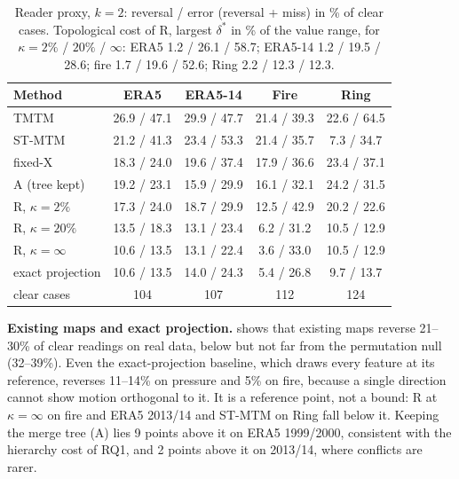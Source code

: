 \documentclass[review]{vgtc}                 %
\begin{document}
\begin{table}[t]
\centering\small
\setlength{\tabcolsep}{2.6pt}
\begin{tabular}{lcccc}\toprule
Method & ERA5 & ERA5-14 & Fire & Ring\\\midrule
TMTM & 26.9 / 47.1 & 29.9 / 47.7 & 21.4 / 39.3 & 22.6 / 64.5\\
ST-MTM & 21.2 / 41.3 & 23.4 / 53.3 & 21.4 / 35.7 & \phantom{0}7.3 / 34.7\\
fixed-X & 18.3 / 24.0 & 19.6 / 37.4 & 17.9 / 36.6 & 23.4 / 37.1\\
A (tree kept) & 19.2 / 23.1 & 15.9 / 29.9 & 16.1 / 32.1 & 24.2 / 31.5\\\midrule
R, $\kappa=2\%$ & 17.3 / 24.0 & 18.7 / 29.9 & 12.5 / 42.9 & 20.2 / 22.6\\
R, $\kappa=20\%$ & 13.5 / 18.3 & 13.1 / 23.4 & \phantom{0}6.2 / 31.2 & 10.5 / 12.9\\
R, $\kappa=\infty$ & 10.6 / 13.5 & 13.1 / 22.4 & \phantom{0}3.6 / 33.0 & 10.5 / 12.9\\\midrule
exact projection & 10.6 / 13.5 & 14.0 / 24.3 & \phantom{0}5.4 / 26.8 & \phantom{0}9.7 / 13.7\\
clear cases & 104 & 107 & 112 & 124\\\bottomrule
\end{tabular}
\caption{Reader proxy, $k=2$: reversal / error (reversal + miss) in \% of clear cases. Topological cost of R, largest $\delta^*$ in \% of the value range, for $\kappa=2\%$ / $20\%$ / $\infty$: ERA5 1.2 / 26.1 / 58.7; ERA5-14 1.2 / 19.5 / 28.6; fire 1.7 / 19.6 / 52.6; Ring 2.2 / 12.3 / 12.3.}
\label{tab:proxy}
\end{table}

\textbf{Existing maps and exact projection.}  shows that existing maps reverse 21--30\% of clear readings on real data, below but not far from the permutation null (32--39\%). Even the exact-projection baseline, which draws every feature at its reference, reverses 11--14\% on pressure and 5\% on fire, because a single direction cannot show motion orthogonal to it. It is a reference point, not a bound: R at $\kappa=\infty$ on fire and ERA5 2013/14 and ST-MTM on Ring fall below it. Keeping the merge tree (A) lies 9 points above it on ERA5 1999/2000, consistent with the hierarchy cost of RQ1, and 2 points above it on 2013/14, where conflicts are rarer.
\end{document}
